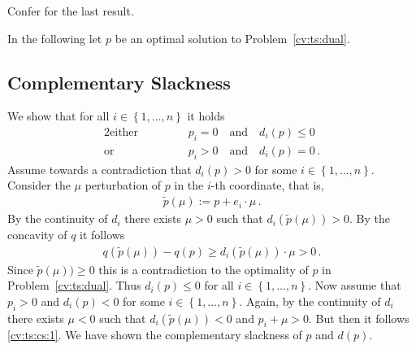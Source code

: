 Confer \cite[Theorem 23.5]{Rockafellar1970}
for the last result.

In the following let $p$ be an optimal solution to 
Problem~\ref{cv:ts:dual}.
\subsection*{Complementary Slackness}
We show that for all 
$
  i\in \left\{ 1,\ldots, n \right\}
$
it holds
\begin{alignat*}{2}
  \text{either}
  &
  &&
  \qquad
  p_i = 0
  \quad
  \text{and}
  \quad
  d_i(p) \le 0
  \\
  \text{or}
  &
  &&
  \qquad
  p_i > 0
  \quad
  \text{and}
  \quad
  d_i(p) = 0
  \,.
\end{alignat*}
Assume towards a contradiction that $d_i(p)>0$ for some 
$
  i\in \left\{ 1,\ldots, n \right\}
$.
Consider
the $\mu$ perturbation of $p$ in the $i$-th coordinate, that is,
\begin{gather}
  \tilde{p}
  (\mu)
  :=
  p
  +
  e_i
  \cdot
  \mu
  \,.
\end{gather}
By the continuity of $d_i$ there exists $\mu >0$ such that
$
d_i(
  \tilde{p}
  (\mu)
)
>0$.
By the concavity of $q$ it follows
\begin{gather}
  \label{cv:ts:cs:1}
  q
  (
  \tilde{p}
  (\mu)
  )
  -
  q(p)
  \ge
d_i(
  \tilde{p}
  (\mu)
)
\cdot
\mu
>0
\,.
\end{gather}
Since
$ 
  \tilde{p}
  (\mu)
  )
  \ge
  0
$
this is a contradiction to the optimality of $p$ in Problem~\ref{cv:ts:dual}. 
Thus
$
  d_i(p)\le 0
$
for all 
$
  i\in \left\{ 1,\ldots, n \right\}
$.
Now assume that
$ p_i>0 $ and 
$
  d_i(p)< 0
$
for some
$
  i\in \left\{ 1,\ldots, n \right\}
$.
Again, by the 
continuity of $d_i$ there exists $\mu <0$ such that
$
d_i(
  \tilde{p}
  (\mu)
)
<0$
and
$
p_i+\mu >0
$.
But then it follows \eqref{cv:ts:cs:1}.
We have shown the complementary slackness of $p$ and $d(p)$.


